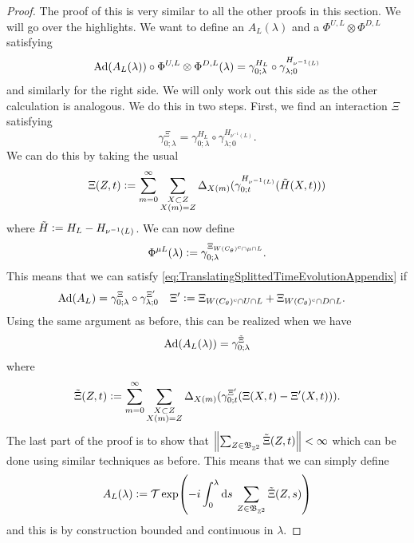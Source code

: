 \documentclass[11pt,a4paper,twoside]{article}
\numberwithin{equation}{section}
\begin{document}
	\begin{proof}
		The proof of this is very similar to all the other proofs in this section. We will go over the highlights. We want to define an $A_L(\lambda)$ and a $\Phi^{U,L}\otimes\Phi^{D,L}$ satisfying
		\begin{equation}
			\Ad{A_L(\lambda)}\circ\Phi^{U,L}\otimes\Phi^{D,L}(\lambda)=\gamma^{H_L}_{0;\lambda}\circ\gamma^{H_{\nu^{-1}(L)}}_{\lambda;0}
		\end{equation}
		and similarly for the right side. We will only work out this side as the other calculation is analogous. We do this in two steps. First, we find an interaction $\Xi$ satisfying
		\begin{equation}
			\gamma^\Xi_{0;\lambda}=\gamma^{H_L}_{0;\lambda}\circ\gamma^{H_{\nu^{-1}(L)}}_{\lambda;0}.
		\end{equation}
		We can do this by taking the usual
		\begin{equation}
			\Xi(Z,t)\vcentcolon= \sum_{m=0}^{\infty}\sum_{\substack{X\subset Z\\X(m)=Z}}\Delta_{X(m)}(\gamma^{H_{\nu^{-1}(L)}}_{0;t}(\tilde{H}(X,t)))
		\end{equation}
		where $\tilde{H}\vcentcolon= H_L-H_{\nu^{-1}(L)}$. We can now define
		\begin{equation}
			\Phi^{\mu L}(\lambda)\vcentcolon=\gamma^{\Xi_{W(C_\theta)^c\cap\mu\cap L}}_{0;\lambda}.
		\end{equation}
		This means that we can satisfy \ref{eq:TranslatingSplittedTimeEvolutionAppendix} if
		\begin{align}
			\Ad{A_L}&=\gamma^{\Xi}_{0;\lambda}\circ\gamma^{\Xi'}_{\lambda;0}&\Xi'&\defeq \Xi_{W(C_\theta)^c\cap U\cap L}+\Xi_{W(C_\theta)^c\cap D\cap L}.
		\end{align}
		Using the same argument as before, this can be realized when we have
		\begin{equation}
			\Ad{A_L(\lambda)}=\gamma^{\tilde\Xi}_{0;\lambda}
		\end{equation}
		where
		\begin{equation}
			\tilde\Xi(Z,t)\vcentcolon= \sum_{m=0}^{\infty}\sum_{\substack{X\subset Z\\X(m)=Z}}\Delta_{X(m)}(\gamma^{\Xi'}_{0;t}(\Xi(X,t)-\Xi'(X,t))).
		\end{equation}
		The last part of the proof is to show that $\norm{\sum_{Z\in\mathfrak{B}_{\mathbb Z^2}}\tilde\Xi(Z,t)}<\infty$ which can be done using similar techniques as before. This means that we can simply define
		\begin{equation}
			A_L(\lambda)\vcentcolon=\mathcal{T}\exp(-i\int_0^\lambda \text{d} s\: \sum_{Z\in \mathfrak{B}_{\mathbb Z^2}}\tilde{\Xi}(Z,s))
		\end{equation}
		and this is by construction bounded and continuous in $\lambda$.
	\end{proof}
	\clearpage
	
	
\end{document}
